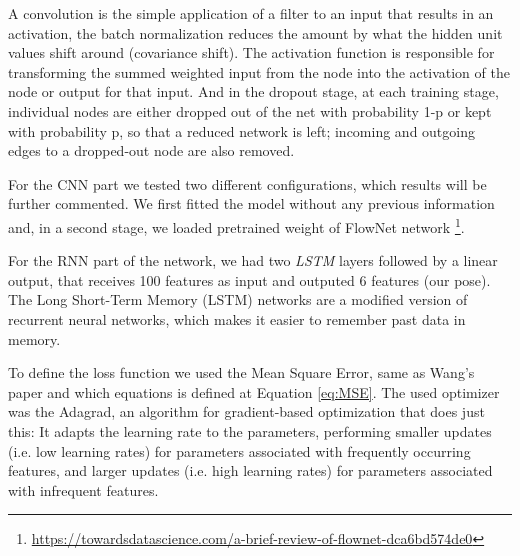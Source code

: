         A convolution is the simple application of a filter to an input that results in an activation, the batch normalization reduces the amount by what the hidden unit values shift around (covariance shift). The activation function is responsible for transforming the summed weighted input from the node into the activation of the node or output for that input. And in the dropout stage, at each training stage, individual nodes are either dropped out of the net with probability 1-p or kept with probability p, so that a reduced network is left; incoming and outgoing edges to a dropped-out node are also removed.
        
        For the CNN part we tested two different configurations, which results will be further commented. We first fitted the model without any previous information and, in a second stage, we loaded pretrained weight of FlowNet network \footnote{\url{https://towardsdatascience.com/a-brief-review-of-flownet-dca6bd574de0}}.
        
        For the RNN part of the network, we had two \emph{LSTM} layers followed by a linear output, that receives 100 features as input and outputed 6 features (our pose). The Long Short-Term Memory (LSTM) networks are a modified version of recurrent neural networks, which makes it easier to remember past data in memory.
        
        To define the loss function we used the Mean Square Error, same as Wang's paper and which equations is defined at Equation \ref{eq:MSE}. The used optimizer was the Adagrad, an algorithm for gradient-based optimization that does just this: It adapts the learning rate to the parameters, performing smaller updates (i.e. low learning rates) for parameters associated with frequently occurring features, and larger updates (i.e. high learning rates) for parameters associated with infrequent features.